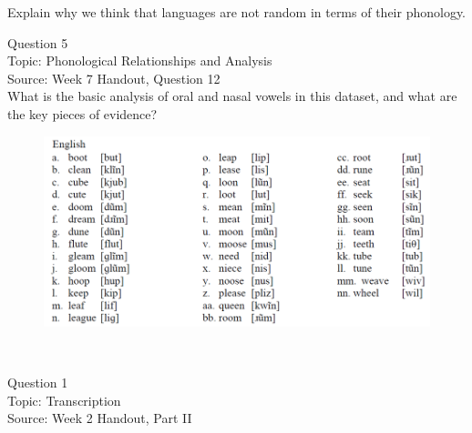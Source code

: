 \documentclass[12pt]{article}
\begin{document}
Explain why we think that languages are not random in terms of their phonology.\\


\newpage

{\large Question 5}\\

Topic: Phonological Relationships and Analysis\\
Source: Week 7 Handout, Question 12\\

What is the basic analysis of oral and nasal vowels in this dataset, and what are the key pieces of evidence?\\

\begin{figure}[H]
\includegraphics{../images/english12.png}
\end{figure}

\newpage

\begin{center}
\textbf{{\color{red}{\HUGE END OF EXAM}}}\\

\end{center}
\newpage

\begin{center}
\textbf{{\color{blue}{\HUGE START OF EXAM\\}}}

\textbf{{\color{blue}{\HUGE Student ID: 17393\\}}}

\textbf{{\color{blue}{\HUGE \\}}}

\end{center}
\newpage

{\large Question 1}\\

Topic: Transcription\\
Source: Week 2 Handout, Part II\\
\end{document}
